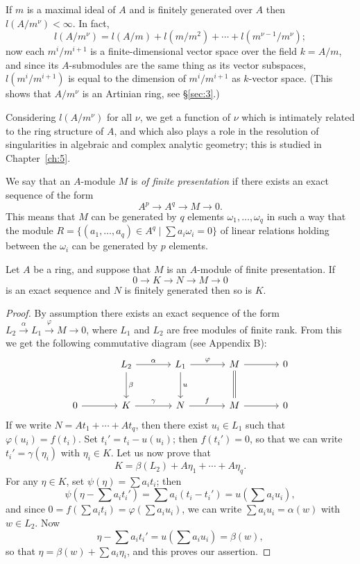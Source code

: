 If $m$ is a maximal ideal of $A$ and is finitely generated over $A$ then
$l(A/m^\nu) < \infty$. In fact,
\[
  l(A/m^\nu) = l(A/m) + l(m/m^2) + \cdots + l(m^{\nu-1}/m^\nu);
\]
now each $m^i/m^{i+1}$ is a finite-dimensional vector space over the field
$k = A/m$, and since its $A$-submodules are the same thing as its vector
subspaces, $l(m^i/m^{i+1})$ is equal to the dimension of $m^i/m^{i+1}$ as $k$-vector
space. (This shows that $A/m^\nu$ is an Artinian ring, see \S\ref{sec:3}.)

Considering $l(A/m^\nu)$ for all $\nu$, we get a function of $\nu$ which is intimately
related to the ring structure of $A$, and which also plays a role in the resolution
of singularities in algebraic and complex analytic geometry; this is studied in
Chapter~\ref{ch:5}.

We say that an $A$-module $M$ is \emph{of finite presentation} if there exists an
exact sequence of the form
\[
  A^p \to A^q \to M \to 0.
\]
This means that $M$ can be generated by $q$ elements $\omega_1, \ldots, \omega_q$ in such a way
that the module $R = \{(a_1, \ldots, a_q) \in A^q \mid \sum a_i\omega_i = 0\}$ of linear relations
holding between the $\omega_i$ can be generated by $p$ elements.

\begin{theorem}\label{thm:2.6}
Let $A$ be a ring, and suppose that $M$ is an $A$-module of finite
presentation. If
\[
  0 \to K \to N \to M \to 0
\]
is an exact sequence and $N$ is finitely generated then so is $K$.
\end{theorem}

\begin{proof}
By assumption there exists an exact sequence of the form
$L_2 \xrightarrow{\alpha} L_1 \xrightarrow{\varphi} M \to 0$, where $L_1$ and $L_2$ are free modules of finite rank.
From this we get the following commutative diagram (see Appendix B):
\[
  \begin{tikzcd}[column sep=large, row sep=large]
    & L_2 \arrow[r, "\alpha"] \arrow[d, "\beta"] & L_1 \arrow[r, "\varphi"] \arrow[d, "u"] & M \arrow[r] \arrow[d, equal] & 0 \\
    0 \arrow[r] & K \arrow[r, "\gamma"] & N \arrow[r, "f"] & M \arrow[r] & 0
  \end{tikzcd}
\]
If we write $N = At_1 + \cdots + At_q$, then there exist $u_i \in L_1$ such that
$\varphi(u_i) = f(t_i)$. Set $t_i' = t_i - u(u_i)$; then $f(t_i') = 0$, so that we can write
$t_i' = \gamma(\eta_i)$ with $\eta_i \in K$. Let us now prove that
\[
  K = \beta(L_2) + A\eta_1 + \cdots + A\eta_q.
\]
For any $\eta \in K$, set $\psi(\eta) = \sum a_i t_i$; then
\[
  \psi\left(\eta - \sum a_i t_i'\right) = \sum a_i (t_i - t_i') = u\left(\sum a_i u_i\right),
\]
and since $0 = f\left(\sum a_i t_i\right) = \varphi\left(\sum a_i u_i\right)$, we can write $\sum a_i u_i = \alpha(w)$
with $w \in L_2$. Now
\[
  \eta - \sum a_i t_i' = u\left(\sum a_i u_i\right) = \beta(w),
\]
so that $\eta = \beta(w) + \sum a_i\eta_i$, and this proves our assertion.
\end{proof}

